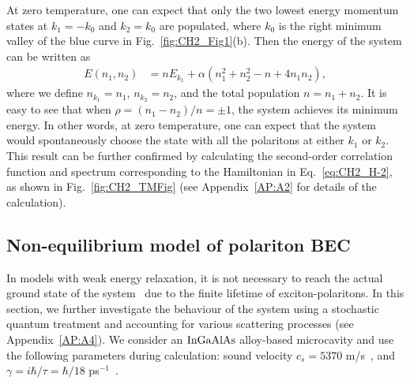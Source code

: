 At zero temperature, one can expect that only the two lowest energy momentum states at $k_1= -k_0$ and $k_2=k_0$ are populated, where $k_0$ is the right minimum valley of the blue curve in Fig.~\ref{fig:CH2_Fig1}(b). 
Then the energy of the system can be written as
%
\begin{align}
	E\left( n_1 , n_2 \right) &= nE_{k_1} + \alpha \left( n_1^2 +n_2^2 - n + 4n_1 n_2 \right),
	\label{eq:CH2_E-2}
\end{align}
%
where we define $n_{k_1} = n_1 $, $n_{k_2} = n_2$, and the total population $n =n_1 +n_2$.
It is easy to see that when $\rho=\left( n_1-n_2 \right)/n = \pm 1$, the system achieves its minimum energy. 
In other words, at zero temperature, one can expect that the system would spontaneously choose the state with all the polaritons at either $k_1$ or $k_2$. 
This result can be further confirmed by calculating the second-order correlation function and spectrum corresponding to the Hamiltonian in Eq.~\eqref{eq:CH2_H-2}, as shown in Fig.~\ref{fig:CH2_TMFig} (see Appendix~\ref{AP:A2} for details of the calculation).

% 
% 

\subsection{Non-equilibrium model of polariton BEC}

In models with weak energy relaxation, it is not necessary to reach the actual ground state of the system~\cite{Krizhanovskii:2009aa,Maragkou:2010aa} due to the finite lifetime of exciton-polaritons.
In this section, we further investigate the behaviour of the system using a stochastic quantum treatment and accounting for various scattering processes (see Appendix~\ref{AP:A4}).
We consider an $\rm{InGaAlAs}$ alloy-based microcavity and use the following parameters during calculation: sound velocity $c_s=5370$ m/s~\cite{Hartwell:2010aa}, and $\gamma=i\hbar/\tau=\hbar/18$ ps$^{-1}$~\cite{Gao:2012aa}.


